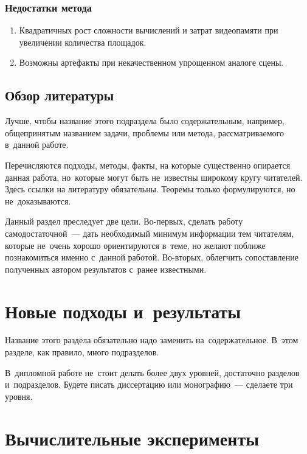 \documentclass[12pt,fleqn]{article}
\begin{document}
\subsubsection{Недостатки метода}

\begin{enumerate}

\item Квадратичных рост сложности вычислений и затрат видеопамяти при увеличении количества площадок.

\item Возможны артефакты при некачественном упрощенном аналоге сцены.

\end{enumerate}

\subsection{Обзор литературы}

Лучше, чтобы название этого подраздела было содержательным, 
например, общепринятым названием задачи, проблемы или метода,
рассматриваемого в~данной работе. 

Перечисляются подходы, методы, факты, на которые существенно опирается данная работа, 
но~которые могут быть не~известны широкому кругу читателей.
Здесь ссылки на литературу обязательны. 
Теоремы только формулируются, но не~доказываются.

Данный раздел преследует две цели. 
Во-первых, сделать работу самодостаточной~--- дать необходимый минимум информации тем читателям,
которые не~очень хорошо ориентируются в~теме, но желают поближе познакомиться именно с~данной работой.
Во-вторых, облегчить сопоставление полученных автором результатов с~ранее известными.

\section{Новые подходы и~результаты}

Название этого раздела обязательно надо заменить на~содержательное. 
В~этом разделе, как правило, много подразделов. 

В~дипломной работе не~стоит делать более двух уровней,
достаточно разделов и~подразделов.
Будете писать диссертацию или монографию~--- сделаете три уровня. 
  
\section{Вычислительные эксперименты}
\end{document}
